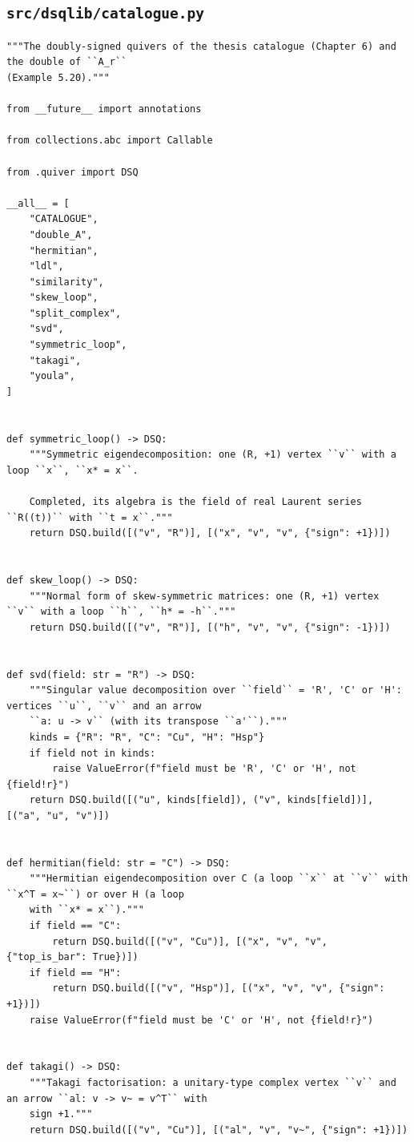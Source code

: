 \documentclass[12pt, a4paper]{report}
\theoremstyle{plain}
\theoremstyle{definition}
\theoremstyle{remark}
\theoremstyle{plain}
\begin{document}
\subsection{\texorpdfstring{\texttt{src/dsqlib/catalogue.py}}{src/dsqlib/catalogue.py}}
\begin{lstlisting}[style=dsqcode]
"""The doubly-signed quivers of the thesis catalogue (Chapter 6) and the double of ``A_r``
(Example 5.20)."""

from __future__ import annotations

from collections.abc import Callable

from .quiver import DSQ

__all__ = [
    "CATALOGUE",
    "double_A",
    "hermitian",
    "ldl",
    "similarity",
    "skew_loop",
    "split_complex",
    "svd",
    "symmetric_loop",
    "takagi",
    "youla",
]


def symmetric_loop() -> DSQ:
    """Symmetric eigendecomposition: one (R, +1) vertex ``v`` with a loop ``x``, ``x* = x``.

    Completed, its algebra is the field of real Laurent series ``R((t))`` with ``t = x``."""
    return DSQ.build([("v", "R")], [("x", "v", "v", {"sign": +1})])


def skew_loop() -> DSQ:
    """Normal form of skew-symmetric matrices: one (R, +1) vertex ``v`` with a loop ``h``, ``h* = -h``."""
    return DSQ.build([("v", "R")], [("h", "v", "v", {"sign": -1})])


def svd(field: str = "R") -> DSQ:
    """Singular value decomposition over ``field`` = 'R', 'C' or 'H': vertices ``u``, ``v`` and an arrow
    ``a: u -> v`` (with its transpose ``a'``)."""
    kinds = {"R": "R", "C": "Cu", "H": "Hsp"}
    if field not in kinds:
        raise ValueError(f"field must be 'R', 'C' or 'H', not {field!r}")
    return DSQ.build([("u", kinds[field]), ("v", kinds[field])], [("a", "u", "v")])


def hermitian(field: str = "C") -> DSQ:
    """Hermitian eigendecomposition over C (a loop ``x`` at ``v`` with ``x^T = x~``) or over H (a loop
    with ``x* = x``)."""
    if field == "C":
        return DSQ.build([("v", "Cu")], [("x", "v", "v", {"top_is_bar": True})])
    if field == "H":
        return DSQ.build([("v", "Hsp")], [("x", "v", "v", {"sign": +1})])
    raise ValueError(f"field must be 'C' or 'H', not {field!r}")


def takagi() -> DSQ:
    """Takagi factorisation: a unitary-type complex vertex ``v`` and an arrow ``al: v -> v~ = v^T`` with
    sign +1."""
    return DSQ.build([("v", "Cu")], [("al", "v", "v~", {"sign": +1})])



\end{lstlisting}
\end{document}
